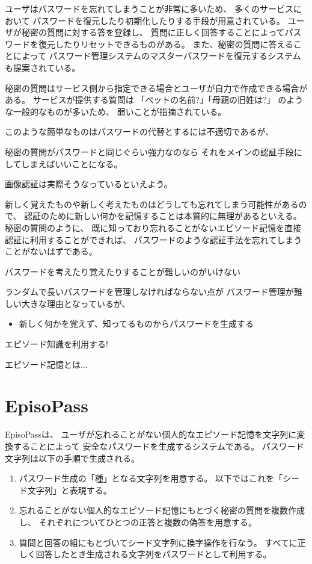 \documentclass[twoside]{wiss}
\begin{document}
ユーザはパスワードを忘れてしまうことが非常に多いため、
多くのサービスにおいて
パスワードを復元したり初期化したりする手段が用意されている。
ユーザが秘密の質問に対する答を登録し、
質問に正しく回答することによってパスワードを復元したりリセットできるものがある。
また、秘密の質問に答えることによって
パスワード管理システムのマスターパスワードを復元するシステム\cite{平野亮:2011-11-07}も提案されている。

秘密の質問はサービス側から指定できる場合とユーザが自力で作成できる場合がある。
サービスが提供する質問は
「ペットの名前?」「母親の旧姓は?」
のような一般的なものが多いため、
弱いことが指摘されている。


このような簡単なものはパスワードの代替とするには不適切であるが、

秘密の質問がパスワードと同じぐらい強力なのなら
それをメインの認証手段にしてしまえばいいことになる。

画像認証\cite{}は実際そうなっているといえよう。


新しく覚えたものや新しく考えたものはどうしても忘れてしまう可能性があるので、
認証のために新しい何かを記憶することは本質的に無理があるといえる。
秘密の質問のように、
既に知っており忘れることがないエピソード記憶を直接認証に利用することができれば、
パスワードのような認証手法を忘れてしまうことがないはずである。



パスワードを考えたり覚えたりすることが難しいのがいけない

ランダムで長いパスワードを管理しなければならない点が
パスワード管理が難しい大きな理由となっているが、

\begin{itemize}
\item 新しく何かを覚えず、知ってるものからパスワードを生成する
\end{itemize}

エピソード知識を利用する!

エピソード記憶とは...

\section{EpisoPass}

EpisoPassは、
ユーザが忘れることがない個人的なエピソード記憶を文字列に変換することによって
安全なパスワードを生成するシステムである。
パスワード文字列は以下の手順で生成される。

\begin{enumerate}
\item パスワード生成の「種」となる文字列を用意する。
以下ではこれを「シード文字列」と表現する。
\item 忘れることがない個人的なエピソード記憶にもとづく秘密の質問を複数作成し、
それぞれについてひとつの正答と複数の偽答を用意する。
\item 質問と回答の組にもとづいてシード文字列に換字操作を行なう。
すべてに正しく回答したとき生成される文字列をパスワードとして利用する。
\end{enumerate}
\end{document}
